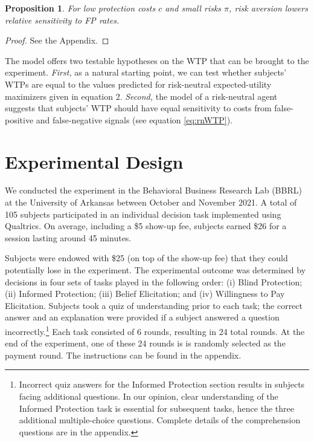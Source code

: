 \documentclass[12pt,a4paper]{article}
\newtheorem{theorem}{Proposition}
\begin{document}
\begin{theorem}
For low protection costs $c$ and small risks $\pi$, risk aversion lowers relative sensitivity to FP rates. 
\end{theorem}\label{thm:riskAverse2}  

\begin{proof}
See the Appendix.
\end{proof}


\noindent The model offers two testable hypotheses on the WTP that can be brought to the experiment. \emph{First,} as a natural starting point, we can test whether subjects' WTPs are equal to the values predicted for risk-neutral expected-utility maximizers given in equation 2. 
\emph{Second,} the model of a risk-neutral agent suggests that subjects' WTP should have equal sensitivity to costs from false-positive and false-negative signals (see equation \ref{eq:rnWTP}). 



\section{Experimental Design}\label{sec:design}

We conducted the experiment in the Behavioral Business Research Lab (BBRL) at the University of Arkansas between October and November 2021.  A total of 105 subjects participated in an individual decision task implemented using Qualtrics.  On average, including a \$5 show-up fee, subjects earned \$26 for a session lasting around 45 minutes. 
 
Subjects were endowed with \$25 (on top of the show-up fee) that they could potentially lose in the experiment. The experimental outcome was determined by decisions in four sets of tasks played in the following order: (i) Blind Protection; (ii) Informed Protection; (iii) Belief Elicitation; and (iv) Willingness to Pay Elicitation. Subjects took a quiz of understanding prior to each task; the correct answer and an explanation were provided if a subject answered a question incorrectly.\footnote{Incorrect quiz answers for the Informed Protection section results in subjects facing additional questions. In our opinion, clear understanding of the Informed Protection task is essential for subsequent tasks, hence the three additional multiple-choice questions. Complete details of the comprehension questions are in the appendix.} Each task consisted of 6 rounds, resulting in 24 total rounds. At the end of the experiment, one of these 24 rounds is is randomly selected as the payment round. The instructions can be found in the appendix.
\end{document}
